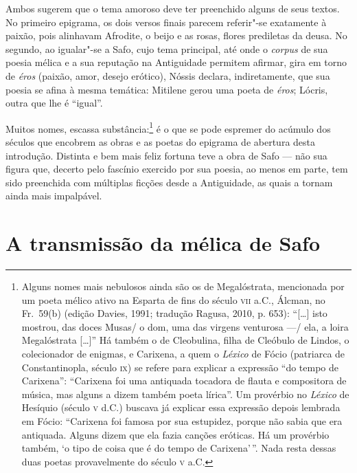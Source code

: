 Ambos sugerem que o tema amoroso deve ter preenchido alguns de seus textos. No
primeiro epigrama, os dois versos finais parecem referir"-se exatamente à
paixão, pois alinhavam Afrodite, o beijo e as rosas, flores prediletas da
deusa. No segundo, ao igualar"-se a Safo, cujo tema principal, até onde o
\textit{corpus} de sua poesia mélica e a sua reputação na Antiguidade permitem
afirmar, gira em torno de \textit{éros} (paixão, amor, desejo erótico), Nóssis
declara, indiretamente, que sua poesia se afina à mesma temática: Mitilene
gerou uma poeta de \textit{éros}; Lócris, outra que lhe é ``igual”.

Muitos nomes, escassa substância:\footnote{ Alguns nomes mais nebulosos ainda são
os de Megalóstrata, mencionada por um poeta mélico ativo na Esparta de fins do
século \textsc{vii} a.C., Álcman, no Fr.~59(b) (edição Davies, 1991;
tradução Ragusa, 2010, p. 653): ``[\ldots{}] isto mostrou, das doces
Musas/ o dom, uma das virgens venturosa ---/ ela, a loira Megalóstrata [\ldots{}]'' Há
também o de Cleobulina, filha de Cleóbulo de Lindos, o colecionador de enigmas,
e Carixena, a quem o \textit{Léxico} de Fócio (patriarca de Constantinopla,
século \textsc{ix}) se refere para explicar a expressão ``do tempo de Carixena”:
``Carixena foi uma antiquada tocadora de flauta e compositora de música,
mas alguns a dizem também poeta lírica”. Um provérbio no \textit{Léxico} de
Hesíquio (século \textsc{v} d.C.) buscava já explicar essa expressão depois lembrada em
Fócio: ``Carixena foi famosa por sua estupidez, porque não sabia que era
antiquada. Alguns dizem que ela fazia canções eróticas. Há um provérbio também,
‘o tipo de coisa que é do tempo de Carixena’\,”. Nada resta dessas duas poetas
provavelmente do século \textsc{v} a.C.} é o que se pode espremer do acúmulo dos
séculos que encobrem as obras e as poetas do epigrama de abertura desta
introdução. Distinta e bem mais feliz fortuna teve a obra de Safo --- não sua
figura que, decerto pelo fascínio exercido por sua poesia, ao menos em parte,
tem sido preenchida com múltiplas ficções desde a Antiguidade, as quais a
tornam ainda mais impalpável. 

\section*{A transmissão da mélica de Safo}

